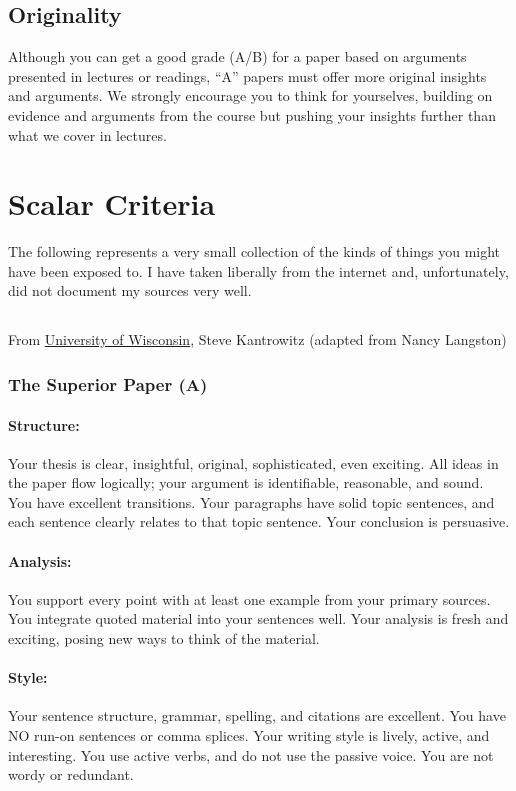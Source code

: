 \documentclass{article}
\begin{document}
\subsection{Originality}
Although you can get a good grade (A/B) for a paper based on arguments presented in lectures or readings, “A” papers must offer more original insights and arguments. We strongly encourage you to think for yourselves, building on evidence and arguments from the course but pushing your insights further than what we cover in lectures. 


\section{Scalar Criteria}
The following represents a very small collection of the kinds of things you might have been exposed to. I have taken liberally from the internet and, unfortunately, did not document my sources very well. 
\subsection{}
From \href{http://mendota.english.wisc.edu/~WAC/page.jsp?id=101&c_type=article&c_id=4}{University of Wisconsin}, Steve Kantrowitz (adapted from Nancy Langston)
\subsubsection{The Superior Paper (A)}
\paragraph{Structure:} Your thesis is clear, insightful, original, sophisticated, even exciting. All ideas in the paper flow logically; your argument is identifiable, reasonable, and sound. You have excellent transitions. Your paragraphs have solid topic sentences, and each sentence clearly relates to that topic sentence. Your conclusion is persuasive.
\paragraph{Analysis:} You support every point with at least one example from your primary sources. You integrate quoted material into your sentences well. Your analysis is fresh and exciting, posing new ways to think of the material.
\paragraph{Style:} Your sentence structure, grammar, spelling, and citations are excellent. You have NO run-on sentences or comma splices. Your writing style is lively, active, and interesting. You use active verbs, and do not use the passive voice. You are not wordy or redundant.
\end{document}
